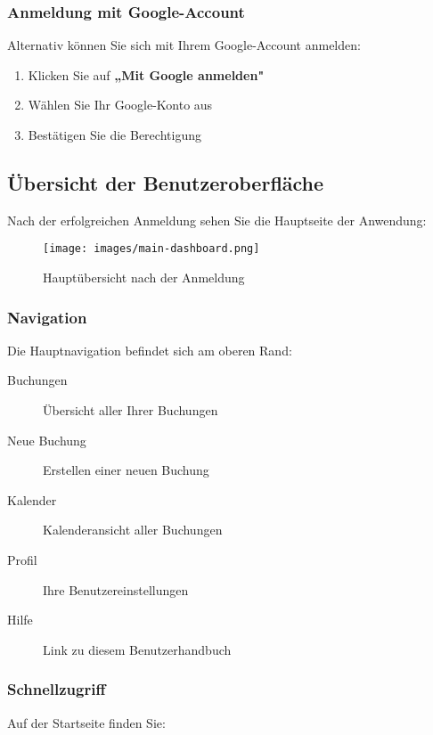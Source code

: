\subsubsection{Anmeldung mit Google-Account}

Alternativ können Sie sich mit Ihrem Google-Account anmelden:

\begin{enumerate}
    \item Klicken Sie auf \textbf{„Mit Google anmelden"}
    \item Wählen Sie Ihr Google-Konto aus
    \item Bestätigen Sie die Berechtigung
\end{enumerate}

\subsection{Übersicht der Benutzeroberfläche}

Nach der erfolgreichen Anmeldung sehen Sie die Hauptseite der Anwendung:

\begin{figure}[H]
    \centering
    \texttt{[image: images/main-dashboard.png]}
    \caption{Hauptübersicht nach der Anmeldung}
    \label{fig:dashboard}
\end{figure}

\subsubsection{Navigation}

Die Hauptnavigation befindet sich am oberen Rand:

\begin{description}
    \item[Buchungen] Übersicht aller Ihrer Buchungen
    \item[Neue Buchung] Erstellen einer neuen Buchung
    \item[Kalender] Kalenderansicht aller Buchungen
    \item[Profil] Ihre Benutzereinstellungen
    \item[Hilfe] Link zu diesem Benutzerhandbuch
\end{description}

\subsubsection{Schnellzugriff}

Auf der Startseite finden Sie:

